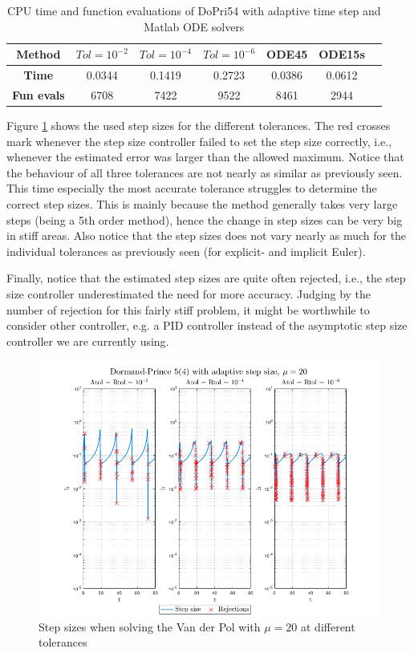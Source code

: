 \begin{table}[H]
    \centering
    \caption{CPU time and function evaluations of DoPri54 with adaptive time step and Matlab ODE solvers}
    \begin{tabular}{|c||c|c|c|c|c|c|} \hline
         \textbf{Method}    & $Tol = 10^{-2}$&   $Tol = 10^{-4}$ & $Tol = 10^{-6}$ & ODE45 & ODE15s     \\ \hline \hline 
         \textbf{Time}      & 0.0344 &   0.1419  &  0.2723 & 0.0386 & 0.0612   \\ \hline
         \textbf{Fun evals} &  6708    &    7422   &     9522 & 8461 & 2944  \\ \hline
    \end{tabular}
    \label{tab6:mu20_adap}
\end{table}

Figure \ref{fig6:adap_mu20_h} shows the used step sizes for the different tolerances. The red crosses mark whenever the step size controller failed to set the step size correctly, i.e., whenever the estimated error was larger than the allowed maximum. Notice that the behaviour of all three tolerances are not nearly as similar as previously seen. This time especially the most accurate tolerance struggles to determine the correct step sizes. This is mainly because the method generally takes very large steps (being a 5th order method), hence the change in step sizes can be very big in stiff areas. Also notice that the step sizes does not vary nearly as much for the individual tolerances as previously seen (for explicit- and implicit Euler). 

Finally, notice that the estimated step sizes are quite often rejected, i.e., the step size controller underestimated the need for more accuracy. Judging by the number of rejection for this fairly stiff problem, it might be worthwhile to consider other controller, e.g. a PID controller instead of the asymptotic step size controller we are currently using. 

\begin{figure}[H]
    \centering
    \includegraphics[width=\textwidth]{graphics/opg6/mu20_h.png}
    \caption{Step sizes when solving the Van der Pol with $\mu = 20$ at different tolerances}
    \label{fig6:adap_mu20_h}
\end{figure}


